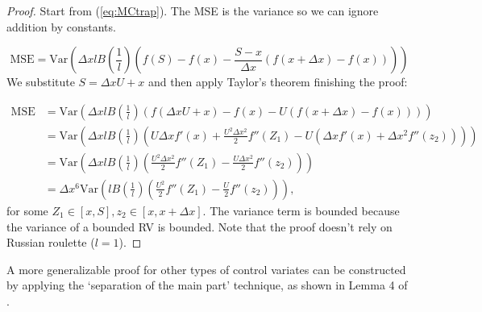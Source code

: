 \documentclass[a4paper,12pt]{article}
\begin{document}
\begin{proof}
    Start from (\ref{eq:MCtrap}). The MSE is the variance
    so we can ignore addition by constants.

    \begin{equation}
        \text{MSE} = \text{Var}\left( \Delta x l B\left( \frac{1}{l}\right)
        \left(f(S) - f(x) - \frac{S - x}{\Delta x}
        \left(f(x+\Delta x) - f(x)\right) \right)\right)
    \end{equation}
    We substitute $S = \Delta x U + x$ and then apply Taylor's theorem
    finishing the proof:

    \begin{align}
        \text{MSE} & = \text{Var}\left( \Delta x l B\left( \frac{1}{l}\right)
        \left(f(\Delta x U+x) - f(x) - U
        \left(f(x+\Delta x) - f(x)\right) \right)\right)                           \\
                   & = \text{Var}\left( \Delta x l B\left( \frac{1}{l}\right)
        \left( U \Delta x f'(x)+ \frac{U^{2} \Delta x ^{2}}{2} f''(Z_{1})
        - U \left( \Delta x f'(x) +
        \Delta x ^{2} f''(z_{2})\right) \right)\right)                             \\
                   & = \text{Var}\left( \Delta x l B\left( \frac{1}{l}\right)
        \left( \frac{U^{2} \Delta x ^{2}}{2} f''(Z_{1})
        -  \frac{U\Delta x ^{2}}{2} f''(z_{2}) \right)\right)                      \\
                   & =\Delta x ^{6} \text{Var}\left(  l B\left( \frac{1}{l}\right)
        \left( \frac{U^{2} }{2} f''(Z_{1})
        -  \frac{U}{2} f''(z_{2}) \right)\right),
    \end{align}
    for some $Z_{1} \in [x,S], z_{2} \in [x,x+\Delta x]$. The variance term is bounded
    because the variance of a bounded RV is bounded.
    Note that the proof doesn't rely on Russian roulette ($l=1$).
\end{proof}

\begin{related}
    A more generalizable proof for other types of control variates can
    be constructed by applying the \enquote*{separation of the main part} technique,
    as shown in Lemma 4 of \cite{heinrich_monte_1993}.
\end{related}
\end{document}

